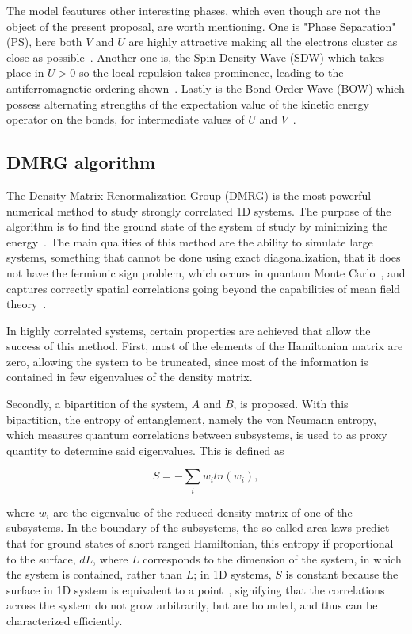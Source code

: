 \documentclass{article}
\begin{document}
The model feautures other interesting phases, which even though are not the object of the present proposal, are worth mentioning. One is "Phase Separation" (PS), here both $V$ and $U$ are highly attractive making all the electrons cluster as close as possible~\cite{Diagram}. Another one is, the Spin Density Wave (SDW) which takes place in $U>0$ so the local repulsion takes prominence, leading to the antiferromagnetic ordering shown~\cite{Diagram}. Lastly is the Bond Order Wave (BOW) which possess alternating  strengths  of  the  expectation  value  of  the  kinetic energy  operator on  the  bonds, for intermediate values of $U$ and $V$~\cite{Diagram}.
 
\subsection{DMRG algorithm}

The Density Matrix Renormalization Group (DMRG) is the most powerful numerical method to study strongly correlated 1D systems. The purpose of the algorithm is to find the ground state of the system of study by minimizing the energy~\cite{DMRG}. The main qualities of this method are the ability to simulate large systems, something that cannot be done using exact diagonalization, that it does not have the fermionic sign problem, which occurs in quantum Monte Carlo~\cite{DMRG}, and captures correctly spatial correlations going beyond the capabilities of mean field theory~\cite{DMRG}.

In highly correlated systems, certain properties are achieved that allow the success of this method. First, most of the elements of the Hamiltonian matrix are zero, allowing the system to be truncated, since most of the information is contained in few eigenvalues of the density matrix.

Secondly, a bipartition of the system, $A$ and $B$, is proposed. With this bipartition, the entropy of entanglement, namely the von Neumann entropy, which measures quantum correlations between subsystems, is used to as proxy quantity to determine said eigenvalues. This is defined as~\cite{DMRG}

\begin{equation}
    S=-\sum_iw_iln(w_i),
\end{equation}

where $w_i$ are the eigenvalue of the reduced density matrix of one of the subsystems. In the boundary of the subsystems, the so-called area laws predict that for ground states of short ranged Hamiltonian, this entropy if proportional to the surface, $dL$, where $L$ corresponds to the dimension of the system, in which the system is contained, rather than $L$; in 1D systems, $S$ is constant because the surface in 1D system is equivalent to a point~\cite{DMRG,ORUS2014117}, signifying that the correlations across the system do not grow arbitrarily, but are bounded, and thus can be characterized efficiently.
\end{document}
